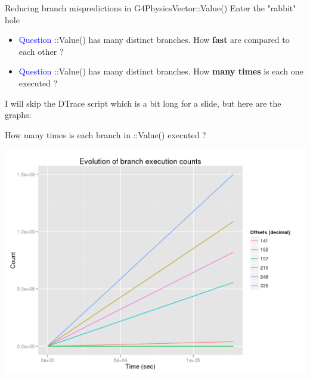 \documentclass{beamer}
\begin{document}
\begin{frame}{Reducing branch mispredictions in G4PhysicsVector::Value()}
Enter the "rabbit" hole\\
\begin{itemize}
\item \textcolor{blue}{Question} ::Value() has many distinct branches. How {\bf fast} are compared to each other ?
\vspace{5mm}
\item \textcolor{blue}{Question} ::Value() has many distinct branches. How {\bf many times} is each one executed ?
\end{itemize}
I will skip the DTrace script which is a bit long for a slide, but here are the graphs:
\end{frame}

\begin{frame}{How many times is each branch in ::Value() executed ?}
\begin{center}
  \includegraphics[width=1.0\textwidth]{branch-count.png}
\end{center}
\end{frame}
\end{document}
